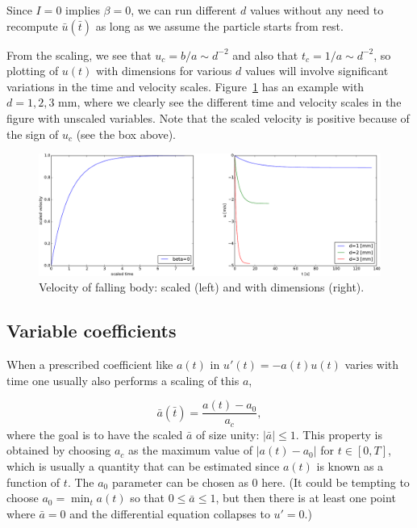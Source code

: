 \documentclass[graybox,envcountchap,sectrefs,final]{svmonodo}
\begin{document}
Since $I=0$ implies $\beta=0$, we can run different $d$ values without
any need to recompute $\bar u(\bar t)$ as long as we assume the particle
starts from rest.

From the scaling, we see that $u_c = b/a\sim d^{-2}$ and
also that $t_c=1/a \sim d^{-2}$, so plotting of $u(t)$ with dimensions
for various $d$ values will involve significant variations in the time
and velocity scales. Figure~\ref{sec:scale:decay:body:fig}
has an example with $d=1,2,3$ mm, where we clearly see the different
time and velocity scales in the figure with unscaled variables.
Note that the scaled velocity is positive because of the sign of $u_c$
(see the box above).


\begin{figure}[!ht]  %
  \centerline{\includegraphics[width=1.0\linewidth]{fig-scaling/falling_body.pdf}}
  \caption{
  Velocity of falling body: scaled (left) and with dimensions (right). \label{sec:scale:decay:body:fig}
  }
\end{figure}



\subsection{Variable coefficients}
\label{sec:scale:decay:jump}

When a prescribed coefficient like $a(t)$ in $u'(t) = -a(t)u(t)$
varies with time one usually also
performs a scaling of this $a$,

\[ \bar a(\bar t) = \frac{a(t) - a_0}{a_c}, \]
where the goal is to have the scaled $\bar a$
of size unity: $|\bar a|\leq 1$.
This property is obtained by choosing $a_c$ as the maximum value
of $|a(t)-a_0|$ for $t\in [0,T]$, which is usually a quantity that
can be estimated since $a(t)$ is known as a function of $t$. The $a_0$
parameter can be chosen as 0 here. (It could be tempting to
choose $a_0=\min_t a(t)$ so that $0\leq \bar a\leq 1$, but then there
is at least one point where $\bar a = 0$ and
the differential equation collapses to $u'=0$.)
\end{document}
